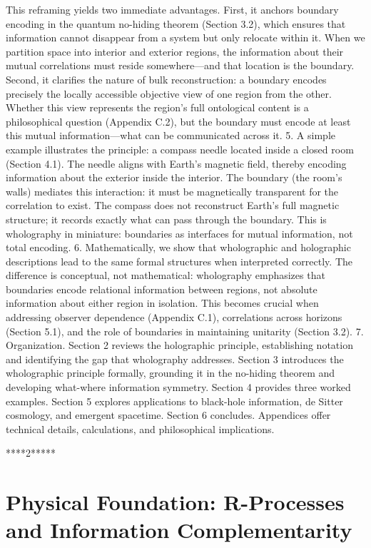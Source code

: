 ﻿\documentclass[12pt]{article}
\begin{document}
 This reframing yields two immediate advantages. First, it anchors boundary encoding in the quantum no-hiding theorem (Section 3.2), which ensures that information cannot disappear from a system but only relocate within it. When we partition space into interior and exterior regions, the information about their mutual correlations must reside somewhere—and that location is the boundary. Second, it clarifies the nature of bulk reconstruction: a boundary encodes precisely the locally accessible objective view of one region from the other. Whether this view represents the region’s full ontological content is a philosophical question (Appendix C.2), but the boundary must encode at least this mutual information—what can be communicated across it.
5.
 A simple example illustrates the principle: a compass needle located inside a closed room (Section 4.1). The needle aligns with Earth’s magnetic field, thereby encoding information about the exterior inside the interior. The boundary (the room’s walls) mediates this interaction: it must be magnetically transparent for the correlation to exist. The compass does not reconstruct Earth’s full magnetic structure; it records exactly what can pass through the boundary. This is wholography in miniature: boundaries as interfaces for mutual information, not total encoding.
6.
 Mathematically, we show that wholographic and holographic descriptions lead to the same formal structures when interpreted correctly. The difference is conceptual, not mathematical: wholography emphasizes that boundaries encode relational information between regions, not absolute information about either region in isolation. This becomes crucial when addressing observer dependence (Appendix C.1), correlations across horizons (Section 5.1), and the role of boundaries in maintaining unitarity (Section 3.2).
7. Organization.
 Section 2 reviews the holographic principle, establishing notation and identifying the gap that wholography addresses. Section 3 introduces the wholographic principle formally, grounding it in the no-hiding theorem and developing what-where information symmetry. Section 4 provides three worked examples. Section 5 explores applications to black-hole information, de Sitter cosmology, and emergent spacetime. Section 6 concludes. Appendices offer technical details, calculations, and philosophical implications.


****2*****
\section{Physical Foundation: R-Processes and Information Complementarity}
\end{document}
